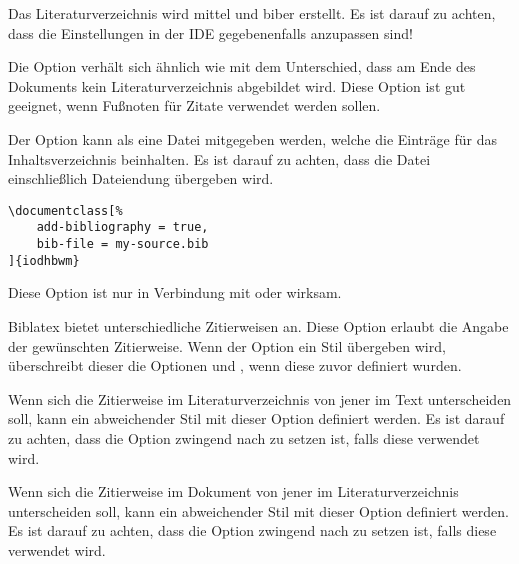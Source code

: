 \documentclass[babel=ngerman,highlight=false]{skdoc}
\begin{document}
                Das Literaturverzeichnis wird mittel  und biber erstellt. Es ist darauf zu achten, dass die Einstellungen in der IDE gegebenenfalls anzupassen sind!\medskip
                
                Die Option verhält sich ähnlich wie  mit dem Unterschied, dass am Ende des Dokuments kein Literaturverzeichnis abgebildet wird. Diese Option ist gut geeignet, wenn Fußnoten für Zitate verwendet werden sollen.\medskip
                
                Der Option kann als  eine Datei mitgegeben werden, welche die Einträge für das Inhaltsverzeichnis beinhalten. Es ist darauf zu achten, dass die Datei einschließlich Dateiendung übergeben wird.
                \begin{verbatim}
\documentclass[%
    add-bibliography = true,
    bib-file = my-source.bib
]{iodhbwm}
                \end{verbatim}
                Diese Option ist nur in Verbindung mit  oder  wirksam.\medskip
                
                Biblatex bietet unterschiedliche Zitierweisen an. Diese Option erlaubt die Angabe der gewünschten Zitierweise. Wenn der Option ein Stil übergeben wird, überschreibt dieser die Optionen  und , wenn diese zuvor definiert wurden.\medskip
                
                Wenn sich die Zitierweise im Literaturverzeichnis von jener im Text unterscheiden soll, kann ein abweichender Stil mit dieser Option definiert werden. Es ist darauf zu achten, dass die Option zwingend nach  zu setzen ist, falls diese verwendet wird.\medskip
                
                Wenn sich die Zitierweise im Dokument von jener im Literaturverzeichnis unterscheiden soll, kann ein abweichender Stil mit dieser Option definiert werden. Es ist darauf zu achten, dass die Option zwingend nach  zu setzen ist, falls diese verwendet wird.\medskip
            
\end{document}
